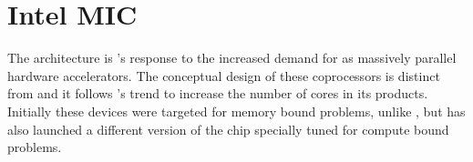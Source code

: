 \documentclass[../thesis]{subfiles}
\begin{document}
	\chapter{Intel MIC}
	\label{chp:mic}

	The \mic architecture \cite{Intel:XeonPhi:QuickStartGuide} is \intel's response to the increased demand for \gpgpus as massively parallel hardware accelerators. The conceptual design of these coprocessors is distinct from \gpgpus and it follows \intel's trend to increase the number of cores in its products. Initially these devices were targeted for memory bound problems, unlike \gpus, but \intel has also launched a different version of the chip specially tuned for compute bound problems.

	
	
	
	
	
	
\end{document}
